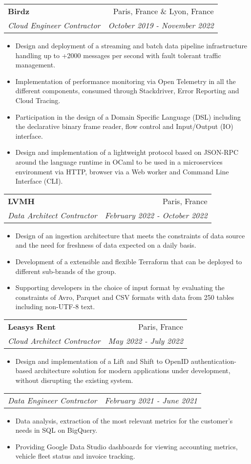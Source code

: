 \documentclass[letterpaper,11pt]{article}
\makeatletter
\newcommand{\resumeItem}[1]{
  \item\small{#1 \vspace{-2pt}}
}
\newcommand{\resumeSubheading}[4]{
  \vspace{-1pt}\item
    \begin{tabular*}{0.97\textwidth}[t]{l@{\extracolsep{\fill}}r}
      \textbf{#1} & #2 \\
      \textit{\small#3} & \textit{\small #4} \\
    \end{tabular*}\vspace{-5pt}
}
\newcommand{\resumeSubSubheading}[2]{
  \begin{tabular*}{0.97\textwidth}{l@{\extracolsep{\fill}}r}
    \textit{\small#1} & \textit{\small #2} \\
  \end{tabular*}\vspace{-5pt}
}
\newcommand{\resumeItemListStart}{\begin{itemize}}
\newcommand{\resumeItemListEnd}{\end{itemize}\vspace{-5pt}}
\makeatother
\begin{document}
\resumeSubheading{Birdz}
{Paris, France \& Lyon, France}
{Cloud Engineer Contractor}
{October 2019 - November 2022}
\resumeItemListStart{}
\resumeItem{
  Design and deployment of a streaming and batch data pipeline infrastructure
  handling up to +2000 messages per second with fault tolerant traffic management.
}
\resumeItem{
  Implementation of performance monitoring via Open Telemetry in all the different
  components, consumed through Stackdriver, Error Reporting and Cloud Tracing.
}
\resumeItem{
  Participation in the design of a Domain Specific Language (DSL) including the
  declarative binary frame reader, flow control and Input/Output (IO)
  interface.
}
\resumeItem{
  Design and implementation of a lightweight protocol based on JSON-RPC around the
  language runtime in OCaml to be used in a microservices environment via HTTP,
  browser via a Web worker and Command Line Interface (CLI).
}
\resumeItemListEnd{}


\resumeSubheading{LVMH}
{Paris, France}
{Data Architect Contractor}
{February 2022 - October 2022}
\resumeItemListStart{}
\resumeItem{
  Design of an ingestion architecture that meets the constraints of data source
  and the need for freshness of data expected on a daily basis.
}
\resumeItem{
  Development of a extensible and flexible Terraform that can be deployed to
  different sub-brands of the group.
}
\resumeItem{
  Supporting developers in the choice of input format by evaluating the
  constraints of Avro, Parquet and CSV formats with data from 250 tables including
  non-UTF-8 text.
}
\resumeItemListEnd{}


\resumeSubheading{Leasys Rent}
{Paris, France}
{Cloud Architect Contractor}
{May 2022 - July 2022}
\resumeItemListStart{}
\resumeItem{
  Design and implementation of a Lift and Shift to OpenID authentication-based
  architecture solution for modern applications under development, without
  disrupting the existing system.
}
\resumeItemListEnd{}

\resumeSubSubheading{Data Engineer Contractor}
{February 2021 - June 2021}
\resumeItemListStart{}
\resumeItem{
  Data analysis, extraction of the most relevant metrics for the
  customer's needs in SQL on BigQuery.
}
\resumeItem{
  Providing Google Data Studio dashboards for viewing accounting metrics, vehicle
  fleet status and invoice tracking.
}
\resumeItemListEnd{}
\end{document}
